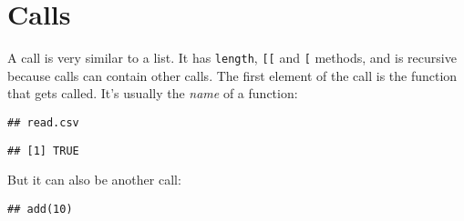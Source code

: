 \hypertarget{calls}{%
\section{Calls}\label{calls}}

A call is very similar to a list. It has \texttt{length},
\texttt{{[}{[}} and \texttt{{[}} methods, and is recursive because calls
can contain other calls. The first element of the call is the function
that gets called. It's usually the \emph{name} of a function:

\begin{Shaded}
\begin{Highlighting}[]
\StringTok{ }\NormalTok{(}\NormalTok{(}\NormalTok{, } \NormalTok{))}
\NormalTok{x[[}\NormalTok{]]}
\end{Highlighting}
\end{Shaded}

\begin{verbatim}
## read.csv
\end{verbatim}

\begin{Shaded}
\begin{Highlighting}[]
\NormalTok{(x[[}\NormalTok{]])}
\end{Highlighting}
\end{Shaded}

\begin{verbatim}
## [1] TRUE
\end{verbatim}

But it can also be another call:

\begin{Shaded}
\begin{Highlighting}[]
\StringTok{ }\NormalTok{(}\NormalTok{(}\NormalTok{)(}\NormalTok{))}
\NormalTok{y[[}\NormalTok{]]}
\end{Highlighting}
\end{Shaded}

\begin{verbatim}
## add(10)
\end{verbatim}

\begin{Shaded}
\begin{Highlighting}[]
\NormalTok{(y[[}\NormalTok{]])}
\end{Highlighting}
\end{Shaded}

